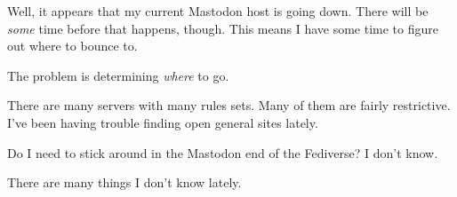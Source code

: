 Well, it appears that my current Mastodon host is going down. There will
be \emph{some} time before that happens, though. This means I have some
time to figure out where to bounce to.

The problem is determining \emph{where} to go.

There are many servers with many rules sets. Many of them are fairly
restrictive. I've been having trouble finding open general sites lately.

Do I need to stick around in the Mastodon end of the Fediverse? I don't
know.

There are many things I don't know lately.
